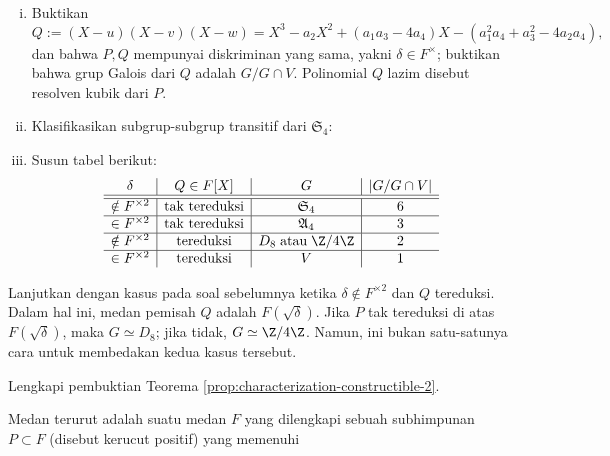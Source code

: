 \begin{Exercises}
\begin{enumerate}[(i)]
\begin{align*}
				\end{align*}
				Dengan memandang $G := \Gal(L|F)$ sebagai subgrup dari $\mathfrak{S}_4$, buktikan bahwa $F(u,v,w) = L^{G \cap V}$, dengan
				\[ V := \{1, (1 2)(3 4), (1 3)(2 4), (1 4)(2 3) \} \lhd \mathfrak{S}_4, \quad V \simeq (\Z/2\Z)^2. \]
			\item Buktikan
				\[ Q := (X-u)(X-v)(X-w) = X^3 - a_2 X^2 + (a_1 a_3 - 4a_4) X - (a_1^2 a_4 + a_3^2 - 4a_2 a_4), \]
				dan bahwa $P, Q$ mempunyai diskriminan yang sama, yakni $\delta \in F^\times$; buktikan bahwa grup Galois dari $Q$ adalah $G/G \cap V$. Polinomial $Q$ lazim disebut resolven kubik dari $P$.
			\item Klasifikasikan subgrup-subgrup transitif dari $\mathfrak{S}_4$:
			\item Susun tabel berikut:
				\[\begin{array}{c|c|c|c}
					\delta & Q \in F[X] & G & |G/G \cap V| \\ \hline\hline
					\notin F^{\times 2} & \text{tak tereduksi} & \mathfrak{S}_4 & 6 \\ \hline
					\in F^{\times 2} & \text{tak tereduksi} & \mathfrak{A}_4 & 3 \\ \hline
					\notin F^{\times 2} & \text{tereduksi} & D_8\; \text{atau}\; \Z/4\Z & 2 \\ \hline
					\in F^{\times 2} & \text{tereduksi} & V & 1
				\end{array}\]
		\end{enumerate}
	\item Lanjutkan dengan kasus pada soal sebelumnya ketika $\delta \notin F^{\times 2}$ dan $Q$ tereduksi. Dalam hal ini, medan pemisah $Q$ adalah $F(\sqrt{\delta})$. Jika $P$ tak tereduksi di atas $F(\sqrt{\delta})$, maka $G \simeq D_8$; jika tidak, $G \simeq \Z/4\Z$. Namun, ini bukan satu-satunya cara untuk membedakan kedua kasus tersebut.
	\item Lengkapi pembuktian Teorema \ref{prop:characterization-constructible-2}.
	\item Medan terurut adalah suatu medan $F$ yang dilengkapi sebuah subhimpunan $P \subset F$ (disebut kerucut positif) yang memenuhi

\end{Exercises}
